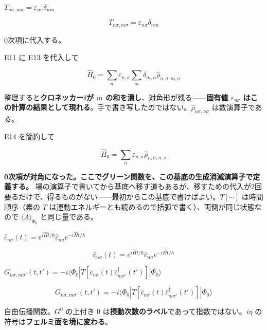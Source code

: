 \documentclass[dvipdfmx,a4paper,11pt]{jsarticle}
\begin{document}
$T_{n\sigma,m\sigma} = \varepsilon_{n\sigma} \delta_{nm}$

\begin{equation}
  T_{n\sigma,m\sigma} = \varepsilon_{n\sigma} \delta_{nm}
  \label{eq:E13}
\end{equation}

0次項に代入する。

E11 に E13 を代入して

\begin{equation}
  \hat H_0 = \sum_{n}{\varepsilon_{n,\sigma} \sum_{m}{\delta_{m, n}  \hat{\rho}_{n,\sigma,m,\sigma}}}
  \label{eq:E14}
\end{equation}

整理すると\textbf{クロネッカー$\delta$が $m$ の和を潰し}、対角形が残る——\textbf{固有値 $\varepsilon_{n\sigma}$ はこの計算の結果として現れる}。手で書き写したのではない。$\hat\rho_{n\sigma,n\sigma}$ は数演算子である。

E14 を簡約して

\begin{equation}
  \hat H_0 = \sum_{n}{\varepsilon_{n,\sigma} \hat{\rho}_{n,\sigma,n,\sigma}}
  \label{eq:E15}
\end{equation}

\textbf{0次項が対角になった。ここでグリーン関数を、この基底の生成消滅演算子で定義する。} 場の演算子で書いてから基底へ移す道もあるが、移すための代入が2回要るだけで、得るものがない——最初からこの基底で書けばよい。$T[\cdots]$ は時間順序（素の $T$ は運動エネルギーとも読めるので括弧で書く）、両側が同じ状態なので $\langle A\rangle_{\Phi_0}$ と同じ量である。

$\hat c_{n\sigma}(t) = e^{i\hat H t/\hbar} \hat c_{n\sigma} e^{-i\hat H t/\hbar}$

\begin{equation}
  \hat c_{n\sigma}(t) = e^{i\hat H t/\hbar} \hat c_{n\sigma} e^{-i\hat H t/\hbar}
  \label{eq:E16}
\end{equation}

$G_{n\sigma,m\sigma'}(t,t') = -i\langle\Phi_0| T[\hat c_{n\sigma}(t) \hat c^\dagger_{m\sigma'}(t')]|\Phi_0\rangle$

\begin{equation}
  G_{n\sigma,m\sigma'}(t,t') = -i\langle\Phi_0| T[\hat c_{n\sigma}(t) \hat c^\dagger_{m\sigma'}(t')]|\Phi_0\rangle
  \label{eq:E17}
\end{equation}

自由伝播関数。$G^0$ の上付き 0 は\textbf{摂動次数のラベル}であって指数ではない。$i\eta$ の符号は\textbf{フェルミ面を境に変わる}。
\end{document}
